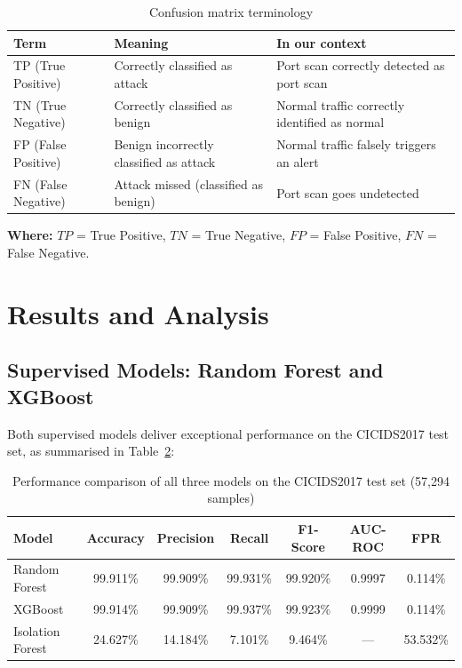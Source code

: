 \documentclass[12pt,a4paper]{report}
\begin{document}
\begin{table}[H]
\centering
\caption{Confusion matrix terminology}
\label{tab:cm_terms}
\begin{tabular}{llp{7cm}}
\toprule
\textbf{Term} & \textbf{Meaning} & \textbf{In our context} \\
\midrule
TP (True Positive) & Correctly classified as attack & Port scan correctly detected as port scan \\
TN (True Negative) & Correctly classified as benign & Normal traffic correctly identified as normal \\
FP (False Positive) & Benign incorrectly classified as attack & Normal traffic falsely triggers an alert \\
FN (False Negative) & Attack missed (classified as benign) & Port scan goes undetected \\
\bottomrule
\end{tabular}
\end{table}

\noindent\textbf{Where:} $TP$ = True Positive, $TN$ = True Negative, $FP$ = False Positive, $FN$ = False Negative.

\section{Results and Analysis}

\subsection{Supervised Models: Random Forest and XGBoost}

Both supervised models deliver exceptional performance on the CICIDS2017 test set, as summarised in Table~\ref{tab:results}:

\begin{table}[H]
\centering
\caption{Performance comparison of all three models on the CICIDS2017 test set (57,294 samples)}
\label{tab:results}
\begin{tabular}{lcccccc}
\toprule
\textbf{Model} & \textbf{Accuracy} & \textbf{Precision} & \textbf{Recall} & \textbf{F1-Score} & \textbf{AUC-ROC} & \textbf{FPR} \\
\midrule
Random Forest & 99.911\% & 99.909\% & 99.931\% & 99.920\% & 0.9997 & 0.114\% \\
XGBoost & 99.914\% & 99.909\% & 99.937\% & 99.923\% & 0.9999 & 0.114\% \\
Isolation Forest & 24.627\% & 14.184\% & 7.101\% & 9.464\% & --- & 53.532\% \\
\bottomrule
\end{tabular}
\end{table}
\end{document}
